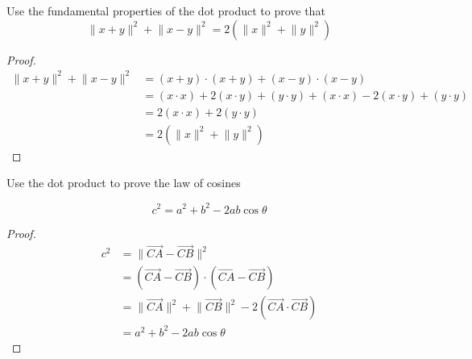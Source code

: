 \begin{exercise} \label{e1.2.11}
    Use the fundamental properties of the dot product to prove that
    \[ \lVert x+y \rVert^2 + \lVert x-y \rVert^2 = 2\left( \lVert x \rVert^2 + \lVert y \rVert^2 \right)  \]
    
    \begin{proof}
        \begin{align*}
            \lVert x+y \rVert^2 + \lVert x-y \rVert^2 &= (x+y) \cdot (x+y) + (x-y) \cdot (x-y) \\
            &= (x \cdot x) + 2(x \cdot y) + (y \cdot y) + (x \cdot x) - 2(x \cdot y) + (y \cdot y) \\
            &= 2(x \cdot x) + 2 (y \cdot y) \\
            &= 2 \left( \lVert x \rVert^2 + \lVert y \rVert^2 \right)
        \end{align*}
    \end{proof}
\end{exercise} %

\begin{exercise} \label{e1.2.12}
    Use the dot product to prove the law of cosines
    
    \[ c^2 = a^2 + b^2 -2ab\cos{\theta} \]
    
    \begin{center}
    \end{center}
    
    \begin{proof}
        \begin{align*}
            c^2 &= \lVert \overrightarrow{CA} - \overrightarrow{CB} \rVert^2 \\
            &= (\overrightarrow{CA}-\overrightarrow{CB}) \cdot (\overrightarrow{CA}-\overrightarrow{CB}) \\
            &= \lVert \overrightarrow{CA} \rVert^2 + \lVert \overrightarrow{CB} \rVert^2 - 2\left( \overrightarrow{CA} \cdot \overrightarrow{CB} \right) \\
            &= a^2 + b^2 - 2ab\cos{\theta}
        \end{align*}
    \end{proof}
\end{exercise} %

